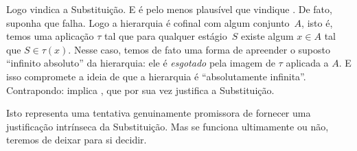 \documentclass[../../../include/open-logic-section]{subfiles}
\begin{document}
Logo \stagescofin{} vindica a Substituição. E é pelo menos plausível
que \stagesinex{} vindique \stagescofin. De fato, suponha que \stagescofin{}
falha. Logo a hierarquia é cofinal com algum conjunto~$A$, isto é, temos uma
aplicação $\tau$ tal que para qualquer estágio~$S$ existe algum $x \in A$ tal
que $S \in \tau(x)$. Nesse caso, temos de fato uma forma de apreender
o suposto ``infinito absoluto'' da hierarquia: ele é
\emph{esgotado} pela imagem de $\tau$ aplicada a $A$. E isso
compromete a ideia de que a hierarquia é ``absolutamente infinita''.
Contrapondo: \stagesinex{} implica \stagescofin, que por sua vez
justifica a Substituição.

Isto representa uma tentativa genuinamente promissora de fornecer uma
justificação intrínseca da Substituição. Mas se funciona
ultimamente ou não, teremos de deixar para si decidir.
\end{document}
